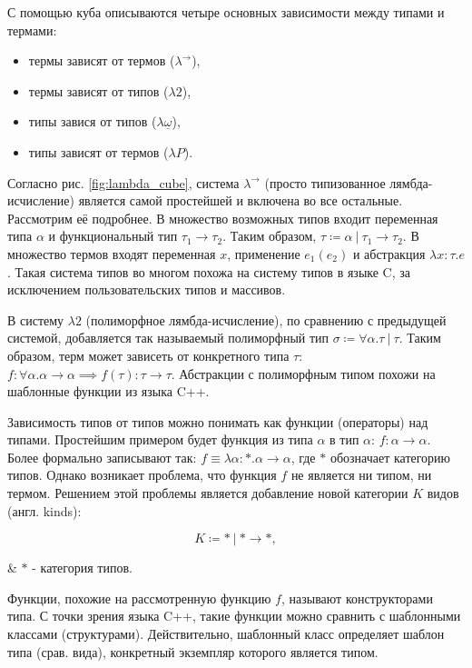 С помощью куба описываются четыре основных зависимости между типами и термами:
\begin{itemize}
    \item термы зависят от термов ($\lambda^{\to}$),
    \item термы зависят от типов ($\lambda 2$),
    \item типы завися от типов ($\lambda \underline{\omega}$),
    \item типы зависят от термов ($\lambda P$).
\end{itemize}

Согласно рис. \ref{fig:lambda_cube}, система $\lambda^{\to}$ (просто типизованное лямбда-исчисление) является самой простейшей и включена во все остальные.
Рассмотрим её подробнее.
В множество возможных типов входит переменная типа $\alpha$ и функциональный тип $\tau_1 \to \tau_2$.
Таким образом, $\tau \coloneqq \alpha ~|~ \tau_1 \to \tau_2$.
В множество термов входят переменная $x$, применение $e_1(e_2)$ и абстракция $\lambda x: \tau. e$.
Такая система типов во многом похожа на систему типов в языке C, за исключением пользовательских типов и массивов.

В систему $\lambda 2$ (полиморфное лямбда-исчисление), по сравнению с предыдущей системой, добавляется так называемый полиморфный тип $\sigma \coloneqq \forall \alpha. \tau ~|~ \tau$.
Таким образом, терм может зависеть от конкретного типа $\tau$: $f: \forall \alpha. \alpha \to \alpha \implies f(\tau): \tau \to \tau$.
Абстракции с полиморфным типом похожи на шаблонные функции из языка C++.

Зависимость типов от типов можно понимать как функции (операторы) над типами.
Простейшим примером будет функция из типа $\alpha$ в тип $\alpha$: $f: \alpha \to \alpha$.
Более формально записывают так: $f \equiv \lambda \alpha: *. \alpha \to \alpha$, где $*$ обозначает категорию типов.
Однако возникает проблема, что функция $f$ не является ни типом, ни термом.
Решением этой проблемы является добавление новой категории $K$ видов (англ. kinds):

\begin{equation}
    \label{eq:kinds}
    K \coloneqq * ~|~ * \to *,
\end{equation}
\begin{eqrem}
    & $*$ - категория типов.
\end{eqrem}

Функции, похожие на рассмотренную функцию $f$, называют конструкторами типа.
С точки зрения языка C++, такие функции можно сравнить с шаблонными классами (структурами).
Действительно, шаблонный класс определяет шаблон типа (срав. вида), конкретный экземпляр которого является типом.

